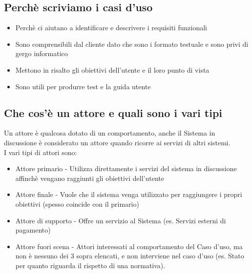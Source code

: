 \documentclass[12pt, a4paper, openany]{book}
\begin{document}
\subsection*{Perchè scriviamo i casi d'uso}
\begin{itemize}
    \item Perchè ci aiutano a identificare e descrivere i requisiti funzionali
    \item Sono comprensibili dal cliente dato che sono i formato testuale e sono privi di gergo informatico
    \item Mettono in risalto gli obiettivi dell'utente e il loro punto di vista
    \item Sono utili per produrre test e la guida utente
\end{itemize}

\subsection*{Che cos'è un attore e quali sono i vari tipi}
Un attore è qualcosa dotato di un comportamento, anche il Sistema in discussione è considerato un attore
quando ricorre ai servizi di altri sistemi.\\
I vari tipi di attori sono:
\begin{itemize}
    \item Attore primario - Utilizza direttamente i servizi del sistema in discussione affinchè
    vengano raggiunti gli obiettivi dell'utente
    \item Attore finale - Vuole che il sistema venga utilizzato per raggiungere i propri obiettivi 
    (spesso coincide con il primario)
    \item Attore di supporto - Offre un servizio al Sistema (es. Servizi esterni di pagamento)
    \item Attore fuori scena - Attori interessati al comportamento del Caso d'uso, ma non è nessuno dei 3 sopra elencati,
    e non interviene nel caso d'uso (es. Stato per quanto riguarda il rispetto di una normativa).
\end{itemize}
\end{document}
